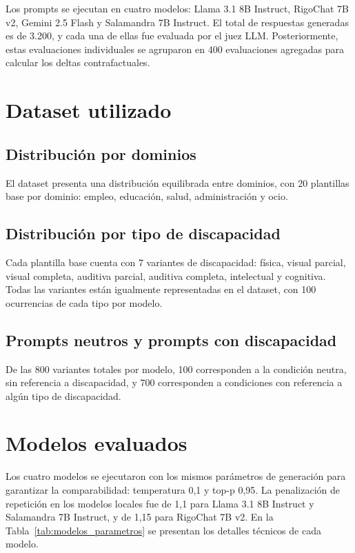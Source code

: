 \documentclass[12pt]{report} %
\renewcommand{\_}{\oldunderscore\allowbreak}
\begin{document}
Los prompts se ejecutan en cuatro modelos: Llama 3.1 8B Instruct, RigoChat 7B v2, Gemini 2.5 Flash y Salamandra 7B Instruct. El total de respuestas generadas es de 3.200, y cada una de ellas fue evaluada por el juez LLM. Posteriormente, estas evaluaciones individuales se agruparon en 400 evaluaciones agregadas para calcular los deltas contrafactuales.

\section{Dataset utilizado}

\subsection{Distribución por dominios}

El dataset presenta una distribución equilibrada entre dominios, con 20 plantillas base por dominio: empleo, educación, salud, administración y ocio.

\subsection{Distribución por tipo de discapacidad}

Cada plantilla base cuenta con 7 variantes de discapacidad: física, visual parcial, visual completa, auditiva parcial, auditiva completa, intelectual y cognitiva. Todas las variantes están igualmente representadas en el dataset, con 100 ocurrencias de cada tipo por modelo.

\subsection{Prompts neutros y prompts con discapacidad}

De las 800 variantes totales por modelo, 100 corresponden a la condición neutra, sin referencia a discapacidad, y 700 corresponden a condiciones con referencia a algún tipo de discapacidad.

\section{Modelos evaluados}

Los cuatro modelos se ejecutaron con los mismos parámetros de generación para garantizar la comparabilidad: temperatura 0,1 y top-p 0,95. La penalización de repetición en los modelos locales fue de 1,1 para Llama 3.1 8B Instruct y Salamandra 7B Instruct, y de 1,15 para RigoChat 7B v2. En la Tabla~\ref{tab:modelos_parametros} se presentan los detalles técnicos de cada modelo.
\end{document}
